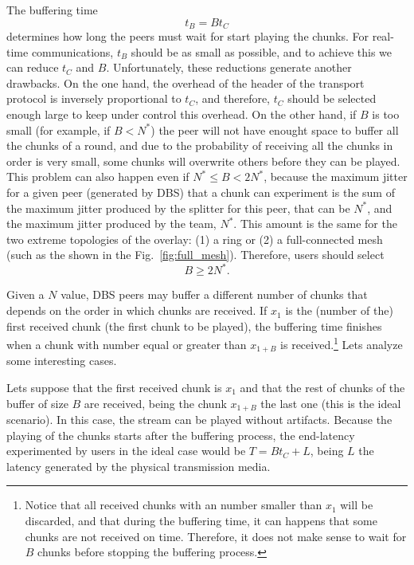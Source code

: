 

\label{sec:buffering_time}
The buffering time
\begin{equation}
  \label{eq:buffering_time}
  t_B = Bt_C
\end{equation}
determines how long the peers must wait for start playing the
chunks. For real-time communications, $t_B$ should be as small as
possible, and to achieve this we can reduce $t_C$ and
$B$. Unfortunately, these reductions generate another drawbacks. On
the one hand, the overhead of the header of the transport protocol is
inversely proportional to $t_C$, and therefore, $t_C$ should be
selected enough large to keep under control this overhead. On the
other hand, if $B$ is too small (for example, if $B<N^*$) the peer
will not have enought space to buffer all the chunks of a round, and
due to the probability of receiving all the chunks in order is very
small, some chunks will overwrite others before they can be
played. This problem can also happen even if $N^*\leq B<2N^*$, because
the maximum jitter for a given peer (generated by DBS) that a chunk
can experiment is the sum of the maximum jitter produced by the
splitter for this peer, that can be $N^*$, and the maximum jitter
produced by the team, $N^*$. This amount is the same for the two
extreme topologies of the overlay: (1) a ring or (2) a full-connected
mesh (such as the shown in the Fig.~\ref{fig:full_mesh}). Therefore,
users should select
\begin{equation}
  \label{eq:minimum_B}
  B\ge 2N^*.
\end{equation}


Given a $N$ value, DBS peers may buffer a different number of chunks
that depends on the order in which chunks are received. If $x_1$ is
the (number of the) first received chunk (the first chunk to be
played), the buffering time finishes when a chunk with number equal or
greater than $x_{1+B}$ is received.\footnote{Notice that all received
  chunks with an number smaller than $x_1$ will be discarded, and that
  during the buffering time, it can happens that some chunks are not
  received on time. Therefore, it does not make sense to wait for $B$
  chunks before stopping the buffering process.} Lets analyze some
interesting cases.

Lets suppose that the first received chunk is $x_1$ and that the rest
of chunks of the buffer of size $B$ are received, being the chunk
$x_{1+B}$ the last one (this is the ideal scenario). In this case, the
stream can be played without artifacts. Because the playing of the
chunks starts after the buffering process, the end-latency
experimented by users in the ideal case would be $T=Bt_C+L$, being $L$
the latency generated by the physical transmission media.

